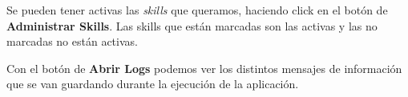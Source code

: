 Se pueden tener activas las \textit{skills} que queramos, haciendo click en el botón de \textbf{Administrar Skills}. Las skills que están marcadas son las activas y las no marcadas no están activas.

Con el botón de \textbf{Abrir Logs} podemos ver los distintos mensajes de información que se van guardando durante la ejecución de la aplicación.